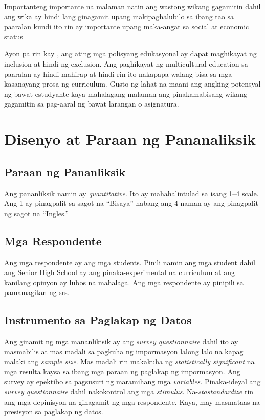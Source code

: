 \documentclass [british, 11pt] {report}
\begin{document}
Importanteng importante na malaman natin ang wastong wikang gagamitin dahil ang
wika ay hindi lang ginagamit upang makipaghalubilo sa ibang tao sa paaralan
kundi ito rin ay importante upang maka-angat sa social at economic
status \parencite{ORLICH}


Ayon pa rin kay \textcite{ORLICH}, ang ating mga polisyang edukasyonal ay
dapat maghikayat ng inclusion at hindi ng exclusion. Ang paghikayat ng
multicultural education sa paaralan ay hindi mahirap at hindi rin ito
nakapapa-walang-bisa sa mga kasanayang prosa ng curriculum. Gusto ng lahat na
maani ang angking potensyal ng bawat estudyante kaya mahalagang malaman ang
pinakamabisang wikang gagamitin sa pag-aaral ng bawat larangan o asignatura.
\chapter{Disenyo at Paraan ng Pananaliksik}
\section{Paraan ng Pananliksik}
Ang pananliksik namin ay \emph{quantitative}. Ito ay mahahalintulad sa isang 1--4 scale.
Ang 1 ay pinagpalit sa sagot na ``Bisaya'' habang ang 4 naman ay ang pinagpalit
ng sagot na ``Ingles.''
\section{Mga Respondente}
Ang mga respondente ay ang mga \glspl{student}. Pinili namin ang mga
\gls{student} dahil ang Senior High School ay ang  pinaka-experimental na
curriculum at ang kanilang opinyon ay lubos na mahalaga. Ang mga respondente ay
pinipili sa pamamagitan ng \Gls{srs}.
\section{Instrumento sa Paglakap ng Datos}
Ang ginamit ng mga mananlikisik ay ang \emph{survey questionnaire} dahil ito ay
masmabilis at mas madali sa pagkuha ng impormasyon lalong lalo na kapag malaki
ang \emph{sample size}. Mas madali rin makakuha ng \emph{statistically
  significant} na mga resulta kaysa sa ibang mga paraan ng paglakap ng
impormasyon. Ang survey ay epektibo sa pagsusuri ng maramihang mga
\emph{variables}. Pinaka-ideyal ang \emph{survey questionnaire } dahil
nakokontrol ang mga \emph{stimulus}. Na-\emph{stastandardize} rin ang mga
depinisyon na ginagamit ng mga respondente. Kaya, may masmataas na presisyon sa
paglakap ng datos.
\end{document}
